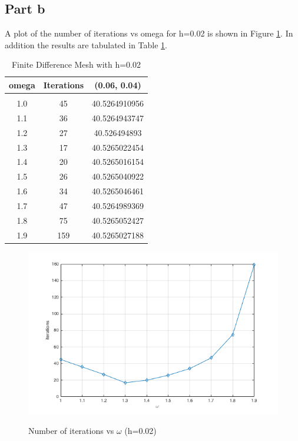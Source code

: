 \documentclass[11pt]{amsart}
\begin{document}
\subsection*{Part b}
A plot of the number of iterations vs omega for h=0.02 is shown in Figure \ref{fig:itr_vs_omega}. In addition the results are tabulated in Table \ref{tbl:fdm_mesh_1}.

\begin{table}[h!]
    \caption{Finite Difference Mesh with h=0.02}
    \label{tbl:fdm_mesh_1}
    \begin{tabular}{ c | c | c}
    	\textbf{omega} & \textbf{Iterations} & \textbf{(0.06, 0.04)}\\ \hline \\
	1.0 & 45 & 40.5264910956\\
	1.1 & 36 & 40.5264943747\\
	1.2 & 27 & 40.526494893\\
	1.3 & 17 & 40.5265022454\\
	1.4 & 20 & 40.5265016154\\
	1.5 & 26 & 40.5265040922\\
	1.6 & 34 & 40.5265046461\\
	1.7 & 47 & 40.5264989369\\
	1.8 & 75 & 40.5265052427\\
	1.9 & 159 & 40.5265027188
    \end{tabular}
\end{table}
\begin{center}
	\begin{figure}[h]
		\caption{Number of iterations vs $\omega$ (h=0.02)}
		\includegraphics[width=\textwidth]{assets/itr_vs_omega.png}\label{fig:itr_vs_omega}
	\end{figure}
\end{center}
\end{document}
